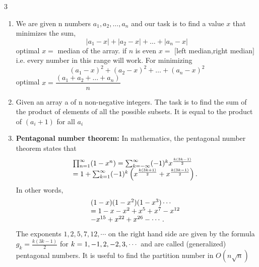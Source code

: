 \documentclass[8pt,a4paper,onesided]{article}
\begin{document}
\begin{multicols}{3}
\begin{enumerate}[resume]
    \[\begin{cases}
        \text{$r_1 + r_2 + \dots + r_{n - 1} + r_n = - \frac{a_{n - 1}}{a_n}$}
        \\
\begin{array}{@{}l}
(r_1r_2 + r_1r_3 + \dots + r_1r_n) \\
+ (r_2r_3 + r_2r_4 + \dots + r_2r_n) + \dots \\
+ r_{n-1}r_n
= \dfrac{a_{n-2}}{a_n}
\end{array}
        \\\vdots\\
        \text{$r_1r_2\dots r_n = (-1)^n\frac{a_0}{a_n}.$}
        \end{cases}\]
    Vieta’s formulas can equivalently be written as
    \[\displaystyle \sum_{1 \leq i_1 < i_2 < \dots <i_k \leq n} \Bigg(\prod_{j = 1}^k{r_{i_j}}\Bigg) = (-1)^k\frac{a_{n - k}}{a_n},\]
    \item We are given n numbers $\displaystyle a_1,a_2,\dots,a_n$ and our task is to find a value $\displaystyle x$ that minimizes the sum,
    \[|a_1 - x| + |a_2 - x| + \dots + |a_n - x|\]
    optimal $\displaystyle x=$ median of the array.
    if $n$ is even $\displaystyle x =$ $[$left median,right median$]$ i.e. every number in this range will work.
    For minimizing
    \[\displaystyle (a_1 - x)^2 + (a_2 - x)^2 + \dots + (a_n - x)^2\]
    optimal $\displaystyle x = \dfrac{(a_1 + a_2 + \dots + a_n)}{ n}$
    \item Given an array a of n non-negative integers. The task is to find the sum of the product of elements of all the possible subsets. It is equal to the product of $\displaystyle (a_i + 1)$ for all $\displaystyle a_i$
    \item \textbf{Pentagonal number theorem:}
    In mathematics, the pentagonal number theorem states that
    \[
\begin{array}{@{}l}
\prod_{n=1}^{\infty} (1 - x^n)
= \sum_{k=-\infty}^{\infty} (-1)^k x^{\frac{k(3k-1)}{2}} \\
= 1 + \sum_{k=1}^{\infty} (-1)^k
\left(
x^{\frac{k(3k+1)}{2}} + x^{\frac{k(3k-1)}{2}}
\right).
\end{array}
\]
    In other words,
\[
\begin{array}{@{}l}
(1 - x)(1 - x^2)(1 - x^3)\cdots
\\ = 1 - x - x^2 + x^5 + x^7 - x^{12} \\ - x^{15} + x^{22} + x^{26} - \cdots .
\end{array}
\]
    The exponents $\displaystyle 1, 2, 5, 7, 12,\cdots$ on the right hand side are given by the formula $g_k = \frac{k(3k - 1)}{2}$ for $\displaystyle \displaystyle k = 1, -1, 2, -2, 3, \cdots$ and are called (generalized) pentagonal numbers.
    It is useful to find the partition number in $O(n \sqrt{n})$
\end{enumerate}


\end{multicols}
\end{document}
